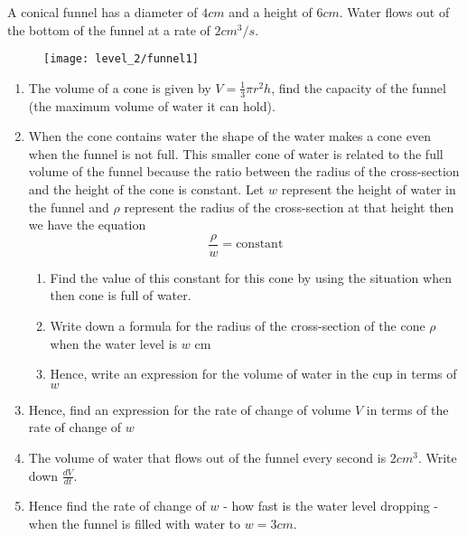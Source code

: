 A conical funnel has a diameter of $4cm$ and a height of $6cm$. Water flows out of the bottom of the funnel at a rate of $2cm^3/s$.
\begin{figure}[H]
	\centering
	\texttt{[image: level\_2/funnel1]}
\end{figure}
\begin{enumerate}
	\item The volume of a cone is given by $V = \frac{1}{3} \pi r^2 h$, find the capacity of the funnel (the maximum volume of water it can hold).
	\item When the cone contains water the shape of the water makes a cone even when the funnel is not full. This smaller cone of water is related to the full volume of the funnel because the ratio between the radius of the cross-section and the height of the cone is constant. Let $w$ represent the height of water in the funnel and $\rho$ represent the radius of the cross-section at that height then we have the equation $$\frac{\rho}{w} = \text{constant}$$
	\begin{enumerate}
	    \item Find the value of this constant for this cone by using the situation when then cone is full of water.
	    \item Write down a formula for the radius of the cross-section of the cone $\rho$ when the water level is $w$ cm
	    \item Hence, write an expression for the volume of water in the cup in terms of $w$
	\end{enumerate}
	\item Hence, find an expression for the rate of change of volume $V$ in terms of the rate of change of $w$
	\item The volume of water that flows out of the funnel every second is $2cm^3$. Write down $\frac{dV}{dt}$.
	\item Hence find the rate of change of $w$ - how fast is the water level dropping - when the funnel is filled with water to $w=3cm$.
\end{enumerate}
